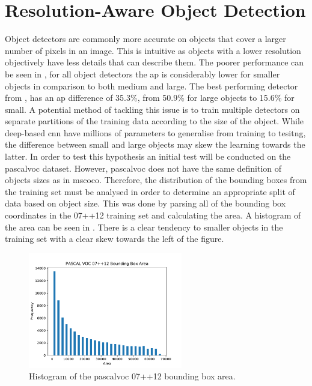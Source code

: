 \section{Resolution-Aware Object Detection}\label{sec:resawareSec}
Object detectors are commonly more accurate on objects that cover a larger number of pixels in an image. This is intuitive as objects with a lower resolution objectively have less details that can describe them. The poorer performance can be seen in , for all object detectors the \gls{ap} is considerably lower for smaller objects in comparison to both medium and large. The best performing detector from \cite{deepres}, has an \gls{ap} difference of 35.3\%, from 50.9\% for large objects to 15.6\% for small. 
A potential method of tackling this issue is to train multiple detectors on separate partitions of the training data according to the size of the object. While deep-based \gls{cnn} have millions of parameters to generalise from training to tesitng, the difference between small and large objects may skew the learning towards the latter. In order to test this hypothesis an initial test will be conducted on the \gls{pascalvoc} dataset. However, \gls{pascalvoc} does not have the same definition of objects sizes as in \gls{mscoco}. Therefore, the distribution of the bounding boxes from the training set must be analysed in order to determine an appropriate split of data based on object size. This was done by parsing all of the bounding box coordinates in the 07++12 training set and calculating the area. A histogram of the area can be seen in . There is a clear tendency to smaller objects in the training set with a clear skew towards the left of the figure.

\begin{figure}[H]
  \centering
    \includegraphics[width=0.6\textwidth]{Figs/Implementation/0712hist.pdf}
      \caption{Histogram of the \gls{pascalvoc} 07++12 bounding box area.}
    \label{fig:0712hist}
\end{figure}

